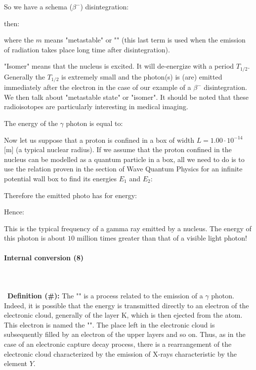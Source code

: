 	So we have a schema ($\beta^{-}$) disintegration:
	
	then:
	
	where the $m$ means "metastable" or "" (this last term is used when the emission of radiation takes place long time after disintegration).
	
	\begin{tcolorbox}[title=Remark,colframe=black,arc=10pt]
	"Isomer" means that the nucleus is excited. It will de-energize with a period $T_{1/2}$. Generally the $T_{1/2}$ is extremely small and the photon(s) is (are) emitted immediately after the electron in the case of our example of a $\beta^{-}$ disintegration. We then talk about "metastable state" or "isomer". It should be noted that these radioisotopes are particularly interesting in medical imaging.
	\end{tcolorbox}
	The energy of the $\gamma$ photon is equal to:
	
	Now let us suppose that a proton is confined in a box of width $L = 1.00\cdot 10^{-14}$ [m] (a typical nuclear radius). If we assume that the proton confined in the nucleus can be modelled as a quantum particle in a box, all we need to do is to use the relation proven in the section of Wave Quantum Physics for an infinite potential wall box to find its energies $E_1$ and $E_2$:
	
	Therefore the emitted photo has for energy:
	
	Hence:
	
	This is the typical frequency of a gamma ray emitted by a nucleus. The energy of this photon is about $10$ million times greater than that of a visible light photon!
	
	\paragraph{Internal conversion (8)}\mbox{}\\\\\
	\textbf{Definition (\#\mydef):} The  "" is a process related to the emission of a $\gamma$ photon. Indeed, it is possible that the energy is transmitted directly to an electron of the electronic cloud, generally of the layer K, which is then ejected from the atom. This electron is named the "". The place left in the electronic cloud is subsequently filled by an electron of the upper layers and so on. Thus, as in the case of an electronic capture decay process, there is a rearrangement of the electronic cloud characterized by the emission of X-rays characteristic by the element $Y$.

